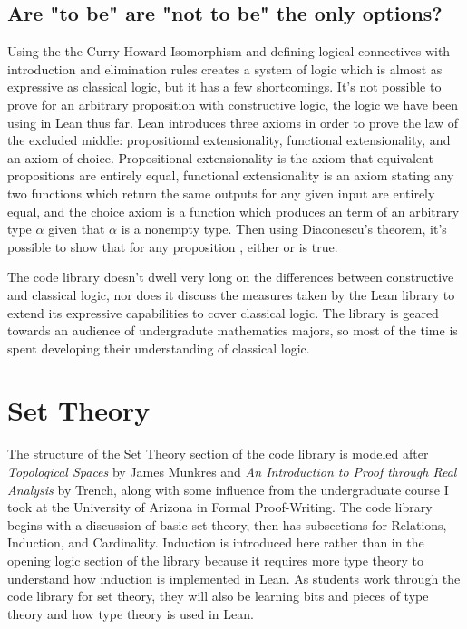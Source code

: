 \subsection{Are "to be" are "not to be" the only options?}

Using the the Curry-Howard Isomorphism and defining logical connectives
with introduction and elimination rules creates a system of logic which
is almost as expressive as classical logic, but it has a few shortcomings.
It's not possible to prove  for an arbitrary proposition 
with constructive logic, the logic we have been using in Lean thus far.
Lean introduces three axioms in order to prove the law of the
excluded middle: propositional extensionality, functional
extensionality, and an axiom of choice. Propositional extensionality is the
axiom that equivalent propositions are entirely equal, functional extensionality
is an axiom stating any two functions which return the same outputs for any
given input are entirely equal, and the choice axiom is a function which produces
an term of an arbitrary type $\alpha$ given that $\alpha$ is a nonempty
type. Then using Diaconescu's theorem, it's possible to show that for any
proposition , either  or  is true. 

The code library doesn't dwell very long on the differences between 
constructive and classical logic, nor does it discuss the measures
taken by the Lean library to extend its expressive capabilities to 
cover classical logic. The library is geared towards an audience of 
undergradute mathematics majors, so most of the time is spent developing
their understanding of classical logic.

\section{Set Theory}

The structure of the Set Theory section of the code library is modeled after 
\textit{Topological Spaces} by James Munkres and 
\textit{An Introduction to Proof through Real Analysis} by Trench, along with
some influence from the undergraduate course I took at the University of Arizona
in Formal Proof-Writing. The code library begins with a discussion of basic
set theory, then has subsections for Relations, Induction, and Cardinality. 
Induction is introduced here rather than in the opening logic section of the 
library because it requires more type theory to understand how induction is
implemented in Lean. As students work through the code library for set theory,
they will also be learning bits and pieces of type theory and how type theory
is used in Lean. 


